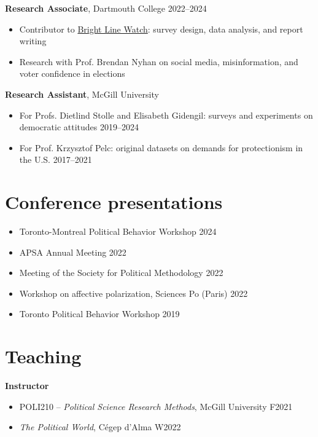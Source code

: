 \documentclass[margin, 10pt]{res}
\begin{document}
\begin{resume}
\textbf{Research Associate}, Dartmouth College \hspace*{0pt}\hfill 2022--2024
\begin{itemize}
	\item Contributor to \href{http://brightlinewatch.org/}{Bright Line Watch}: survey design, data analysis, and report writing
	\item Research with Prof. Brendan Nyhan on social media, misinformation, and voter confidence in elections
\end{itemize}

\textbf{Research Assistant}, McGill University
\begin{itemize}
	\item For Profs. Dietlind Stolle and Elisabeth Gidengil: surveys and experiments on democratic attitudes \hspace*{0pt}\hfill 2019--2024
	\item For Prof. Krzysztof Pelc: original datasets on demands for protectionism in the U.S. \hspace*{0pt}\hfill 2017--2021
\end{itemize}

\section{Conference presentations}
\begin{itemize}
	\item Toronto-Montreal Political Behavior Workshop \hspace*{0pt}\hfill 2024
	\item APSA Annual Meeting \hspace*{0pt}\hfill 2022
	\item Meeting of the Society for Political Methodology \hspace*{0pt}\hfill 2022
	\item Workshop on affective polarization, Sciences Po (Paris) \hspace*{0pt}\hfill 2022
	\item Toronto Political Behavior Workshop \hspace*{0pt}\hfill 2019
\end{itemize}

\section{Teaching}

\textbf{Instructor}
\begin{itemize}
	\item POLI210 -- \textit{Political Science Research Methods}, McGill University \hspace*{0pt}\hfill F2021
	\item \textit{The Political World}, Cégep d'Alma \hspace*{0pt}\hfill W2022
\end{itemize}


\end{resume}
\end{document}
